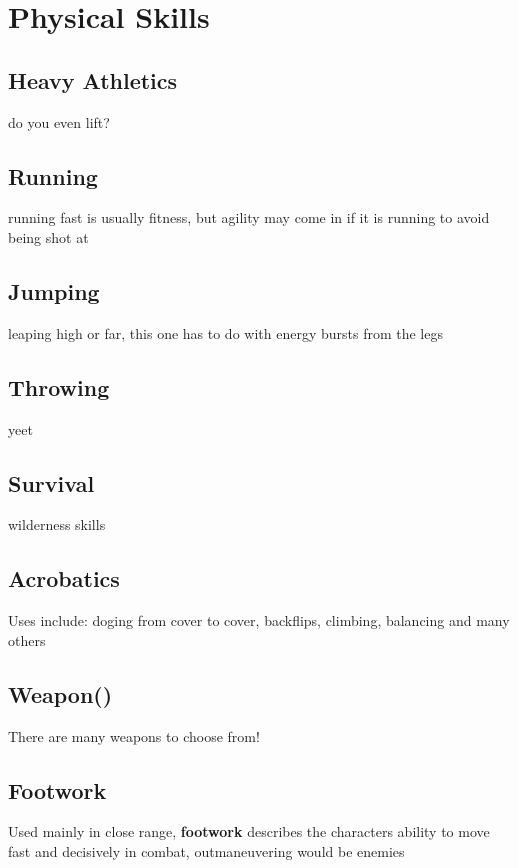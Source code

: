 \section{Physical Skills}\label{sec:strength-skills}
\subsection{Heavy Athletics}\label{subsec:heavy-athletics}
do you even lift?
\subsection{Running}\label{subsec:running}
running fast is usually fitness, but agility may come in if it is running to avoid being shot at
\subsection{Jumping}\label{subsec:jumping}
leaping high or far, this one has to do with energy bursts from the legs
\subsection{Throwing}\label{subsec:throwing}
yeet
\subsection{Survival}\label{subsec:survival}
wilderness skills
\subsection{Acrobatics}\label{subsec:acrobatics}
Uses include: doging from cover to cover, backflips, climbing, balancing and many others
\subsection{Weapon()}\label{subsec:weapon}
There are many weapons to choose from!
\subsection{Footwork}\label{subsec:footwork}
Used mainly in close range, \textbf{footwork} describes the characters ability to move fast and decisively in combat,
outmaneuvering would be enemies
